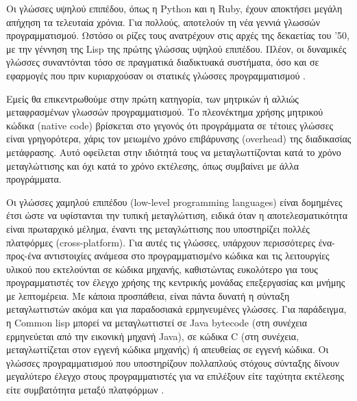 Οι γλώσσες υψηλού επιπέδου, όπως η Python και η Ruby, έχουν αποκτήσει μεγάλη απήχηση τα τελευταία χρόνια. Για πολλούς, αποτελούν τη νέα γεννιά γλωσσών προγραμματισμού. Ωστόσο οι ρίζες τους ανατρέχουν στις αρχές της δεκαετίας του '50, με την γέννηση της Lisp της πρώτης γλώσσας υψηλού επιπέδου. Πλέον, οι δυναμικές γλώσσες συναντόνται τόσο σε πραγματικά διαδικτυακά συστήματα, όσο και σε εφαρμογές που πριν κυριαρχούσαν οι στατικές γλώσσες προγραμματισμού \cite{[ADV09]}.

Εμείς θα επικεντρωθούμε στην πρώτη κατηγορία, των μητρικών ή αλλιώς μεταφρασμένων γλωσσών προγραμματισμού. Το πλεονέκτημα χρήσης μητρικού κώδικα (native code) βρίσκεται στο γεγονός ότι προγράμματα σε τέτοιες γλώσσες είναι γρηγορότερα, χάρις τον μειωμένο χρόνο επιβάρυνσης (overhead) της διαδικασίας μετάφρασης. Αυτό οφείλεται στην ιδιότητά τους να μεταγλωττίζονται κατά το χρόνο μεταγλώττισης και όχι κατά το χρόνο εκτέλεσης, όπως συμβαίνει με άλλα προγράμματα.

Οι γλώσσες χαμηλού επιπέδου (low-level programming languages) είναι δομημένες έτσι ώστε να υφίστανται την τυπική μεταγλώττιση, ειδικά όταν η αποτελεσματικότητα είναι πρωταρχικό μέλημα, έναντι της μεταγλώττισης που υποστηρίζει πολλές πλατφόρμες (cross-platform). Για αυτές τις γλώσσες, υπάρχουν περισσότερες ένα-προς-ένα αντιστοιχίες ανάμεσα στο προγραμματισμένο κώδικα και τις λειτουργίες υλικού που εκτελούνται σε κώδικα μηχανής, καθιστώντας ευκολότερο για τους προγραμματιστές τον έλεγχο χρήσης της κεντρικής μονάδας επεξεργασίας και μνήμης με λεπτομέρεια. 
Με κάποια προσπάθεια, είναι πάντα δυνατή η σύνταξη μεταγλωττιστών ακόμα και για παραδοσιακά ερμηνευμένες γλώσσες. Για παράδειγμα, η Common lisp μπορεί να μεταγλωττιστεί σε Java bytecode (στη συνέχεια ερμηνεύεται από την εικονική μηχανή Java), σε κώδικα C (στη συνέχεια, μεταγλωττίζεται στον εγγενή κώδικα μηχανής) ή απευθείας σε εγγενή κώδικα. Οι γλώσσες προγραμματισμού που υποστηρίζουν πολλαπλούς στόχους σύνταξης δίνουν μεγαλύτερο έλεγχο στους προγραμματιστές για να επιλέξουν είτε ταχύτητα εκτέλεσης είτε συμβατότητα μεταξύ πλατφόρμων \cite{[SQA+07]}.

